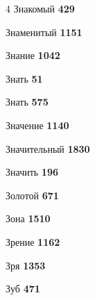 \begin{multicols}{4}
\noindent Знакомый \dotfill \textbf{\color{secondary} 429}\par
\noindent Знаменитый \dotfill \textbf{\color{secondary} 1151}\par
\noindent Знание \dotfill \textbf{\color{secondary} 1042}\par
\noindent Знать \dotfill \textbf{\color{secondary} 51}\par
\noindent Знать \dotfill \textbf{\color{secondary} 575}\par
\noindent Значение \dotfill \textbf{\color{secondary} 1140}\par
\noindent Значительный \dotfill \textbf{\color{secondary} 1830}\par
\noindent Значить \dotfill \textbf{\color{secondary} 196}\par
\noindent Золотой \dotfill \textbf{\color{secondary} 671}\par
\noindent Зона \dotfill \textbf{\color{secondary} 1510}\par
\noindent Зрение \dotfill \textbf{\color{secondary} 1162}\par
\noindent Зря \dotfill \textbf{\color{secondary} 1353}\par
\noindent Зуб \dotfill \textbf{\color{secondary} 471}\par


\end{multicols}
